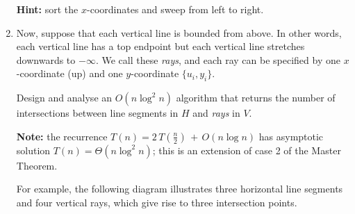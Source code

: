 \documentclass[12pt]{article}
\begin{document}
\begin{question}
\begin{enumerate}[label = (\alph*)]
    \textbf{Hint:} sort the $x$-coordinates and sweep from left to right.

    \item Now, suppose that each vertical line is bounded from above. In other words, each vertical line has a top endpoint but each vertical line stretches downwards to $-\infty$. We call these {\em rays}, and each ray can be specified by one $x$-coordinate (up) and one $y$-coordinate $\{u_i, y_i\}$.
    
    Design and analyse an $O(n\log^2n)$ algorithm that returns the number of intersections between line segments in $H$ and {\em rays} in $V$.

    \textbf{Note:} the recurrence $T(n) = 2\,T(\frac{n}{2}) \,+ \,O(n \log n)$ has asymptotic solution $T(n) = \Theta(n\log^2n)$; this is an extension of case 2 of the Master Theorem.

    For example, the following diagram illustrates three horizontal line segments and four vertical rays, which give rise to three intersection points.
    \begin{center}
    \end{center}


\end{enumerate}
\end{question}
\end{document}
